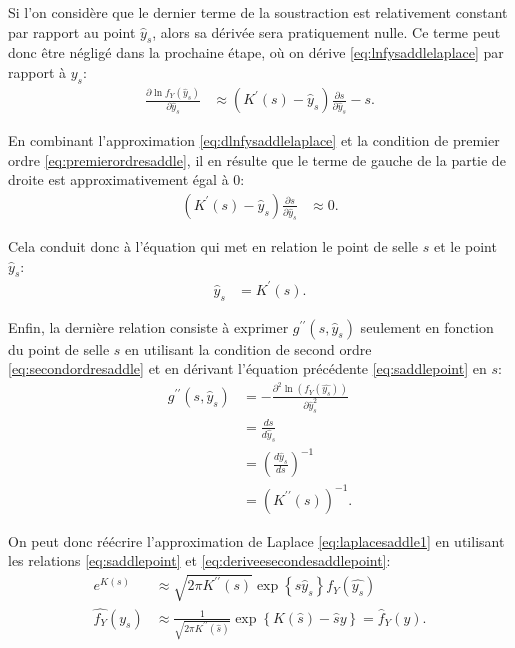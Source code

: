 Si l'on considère que le dernier terme de la soustraction est
relativement constant par rapport au point $\hat{y}_{ s}$, alors sa
dérivée sera pratiquement nulle. Ce terme peut donc être négligé dans
la prochaine étape, où on dérive \eqref{eq:lnfysaddlelaplace} par
rapport à $y_s$:
\begin{align}
  \frac{\partial \ln{f_Y(\hat{y}_{s})}}{\partial \hat{y}_{s}}
  &\approx \left(K^{\prime}(s) - \hat{y}_{s}\right)\frac{\partial
    s}{\partial
    \hat{y}_{s} } -  s.\label{eq:dlnfysaddlelaplace}
\end{align}

En combinant l'approximation \eqref{eq:dlnfysaddlelaplace} et la
condition de premier ordre \eqref{eq:premierordresaddle}, il en
résulte que le terme de gauche de la partie de droite est
approximativement égal à 0:
\begin{align}
  \label{eq:premierodreapprox}
  \left(K^{\prime}( s) - \hat{y}_{ s}\right)\frac{\partial s}{\partial
    \hat{y}_{s} } &\approx 0.
\end{align}

Cela conduit donc à l'équation qui met en relation le point de
selle $s$ et le point $\hat{y}_{ s}$:
\begin{align}
  \label{eq:saddlepoint}
  \hat{y}_{ s} &= K^{\prime}(s).
\end{align}

Enfin, la dernière relation consiste à exprimer $g^{\prime\prime}(
s,\hat{y}_{ s})$ seulement en fonction du point de selle $s$ en
utilisant la condition de second ordre \eqref{eq:secondordresaddle} et
en dérivant l'équation précédente \eqref{eq:saddlepoint} en $s$:
\begin{align}
  \label{eq:deriveesecondesaddlepoint}
  g^{\prime\prime}( s,\hat{y}_{ s}) &= - \frac{\partial^2
    \ln{(f_Y(\hat{y_{s}}))}}{\partial \hat{y}_{ s}^2} \nonumber\\
  &= \frac{d  s}{d\hat{y}_{ s}} \nonumber\\
  &= \left(\frac{d\hat{y}_{ s}}{d  s}\right)^{-1} \nonumber\\
  &= \left(K^{\prime\prime}( s)\right)^{-1}.
\end{align}

On peut donc réécrire l'approximation de Laplace
\eqref{eq:laplacesaddle1} en utilisant les relations
\eqref{eq:saddlepoint} et \eqref{eq:deriveesecondesaddlepoint}:
\begin{align}
  e^{K( s)} &\approx \sqrt{2\pi K^{\prime\prime}( s)}\exp{\left\{ s
      \hat{y}_{ s}\right\}}
  f_Y(\hat{y_{s}}) \nonumber\\
  \hat{f_Y}(y_{s}) &\approx \frac{1}{\sqrt{2\pi K^{\prime\prime}(
      \hat{s})}} \exp{\left\{K(\hat{s}) - \hat{s} y\right\}} =
  \hat{f}_Y(y).\label{eq:approximationsaddlepointordre1}
\end{align}

